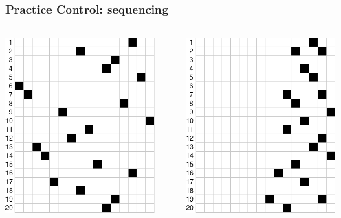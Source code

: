\documentclass[xcolor=svgnames]{beamer}
\begin{document}
\begin{frame}
	\frametitle{Practice Control: sequencing}
	\begin{columns}[2]
			\begin{center}
				\includegraphics[width=0.9\textwidth]{figure/practice_progress_a}
			\end{center}
			\begin{center}
				\includegraphics[width=0.9\textwidth]{figure/practice_progress_b}
			\end{center}
	\end{columns}
\end{frame}
\end{document}
